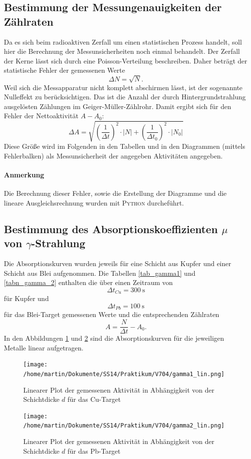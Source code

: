 \documentclass[11pt,ngerman,a4paper]{article}
\begin{document}
\subsection{Bestimmung der Messungenauigkeiten der Zählraten}
Da es sich beim radioaktiven Zerfall um einen statistischen Prozess handelt, soll hier die Berechnung der Messunsicherheiten noch einmal behandelt. Der Zerfall der Kerne lässt sich durch eine Poisson-Verteilung beschreiben. Daher beträgt der statistische Fehler der gemessenen Werte
\begin{equation}
\Delta N = \sqrt{N}.
\end{equation} 
Weil sich die Messapparatur nicht komplett abschirmen lässt, ist der sogenannte Nulleffekt zu berücksichtigen. Das ist die Anzahl der durch Hintergrundstrahlung ausgelösten Zählungen im Geiger-Müller-Zählrohr. Damit ergibt sich für den Fehler der Nettoaktivität $A-A_0$:
\begin{equation}
\Delta A = \sqrt{\left(\frac1{\Delta t}\right)^2 \cdot |N| +\left(\frac1{\Delta t_0}\right)^2 \cdot |N_0| }
\end{equation} 
Diese Größe wird im Folgenden in den Tabellen und in den Diagrammen (mittels Fehlerbalken) als Messunsicherheit der angegeben Aktivitäten angegeben. 
\paragraph{Anmerkung} Die Berechnung dieser Fehler, sowie die Erstellung der Diagramme und die lineare Ausgleichsrechnung wurden mit \textsc{Python} durcheführt.  
\subsection{Bestimmung des Absorptionskoeffizienten $\mu$ von $\gamma$-Strahlung}
Die Absorptionskurven wurden jeweils für eine Schicht aus Kupfer und einer Schicht aus Blei aufgenommen. Die Tabellen \ref{tab_gamma1}  und \ref{tabn_gamma_2} enthalten die über einen Zeitraum von 
\[
\Delta t_{Cu} = \SI{300}{\second}
\]
für Kupfer und
\[
\Delta t_{Pb} = \SI{100}{\second}
\]
für das Blei-Target gemessenen Werte und die entsprechenden Zählraten
\[
A = \frac{N}{\Delta t} - A_0.
\]
In den Abbildungen \ref{abb_gamma1_lin} und \ref{abb_gamma2_lin} sind die Absorptionskurven für die jeweiligen Metalle linear aufgetragen. 
\begin{figure}[H]
\centering
\texttt{[image: /home/martin/Dokumente/SS14/Praktikum/V704/gamma1\_lin.png]}
\caption{Linearer Plot der gemessenen Aktivität in Abhängigkeit von der Schichtdicke $d$ für das Cu-Target}
\label{abb_gamma1_lin}
\end{figure}
\begin{figure}[H]
\centering
\texttt{[image: /home/martin/Dokumente/SS14/Praktikum/V704/gamma2\_lin.png]}
\caption{Linearer Plot der gemessenen Aktivität in Abhängigkeit von der Schichtdicke $d$ für das Pb-Target}
\label{abb_gamma2_lin}
\end{figure}
\end{document}
